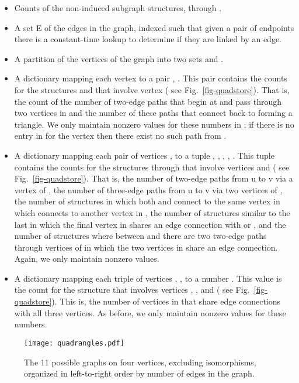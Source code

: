 \documentclass[11pt]{article}
\begin{document}
\begin{itemize}
\item Counts of the non-induced subgraph structures,  through .

\item A set E of the edges in the graph, indexed such that given a pair of endpoints there is a constant-time lookup to determine if they are linked by an edge.

\item A partition of the vertices of the graph into two sets  and . 

\item A dictionary  mapping each vertex  to a pair , .  This pair contains the counts for the structures  and  that involve vertex  ( see  Fig.~\ref{fig-quadstore}). That is, the count of the number of two-edge paths that begin at  and pass through two vertices in  and the number of these paths that connect back to  forming a triangle.  We only maintain nonzero values for these numbers in ; if there is no entry in  for the vertex  then there exist no such path from .

\item A dictionary  mapping each pair of vertices ,  to a tuple , , , , .  This tuple contains the counts for the structures  through  that involve vertices  and  ( see  Fig.~\ref{fig-quadstore}).  That is, the number of two-edge paths from u to v via a vertex of , the number of three-edge paths from u to v via two vertices of , the number of structures in which both  and  connect to the same vertex in  which connects to another vertex in , the number of structures similar to the last in which the final vertex in  shares an edge connection with  or , and the number of structures where between  and  there are two two-edge paths through vertices of  in which the two vertices in  share an edge connection.  Again, we only maintain nonzero values.

\item A dictionary  mapping each triple of vertices , ,   to a number .  This value is the count for the structure  that involves vertices , , and  ( see  Fig.~\ref{fig-quadstore}). This is, the number of vertices in  that share edge connections with all three vertices.  As before, we only maintain nonzero values for these numbers.


\end{itemize}

\begin{figure}
\vspace{-24pt}
\begin{center}
\texttt{[image: quadrangles.pdf]}
\end{center}
\vspace{-24pt}
\caption{The 11 possible graphs on four vertices, excluding 
isomorphisms, organized in left-to-right order by number of edges in the graph.}
\label{fig-quadrangles}
\end{figure}
\end{document}
